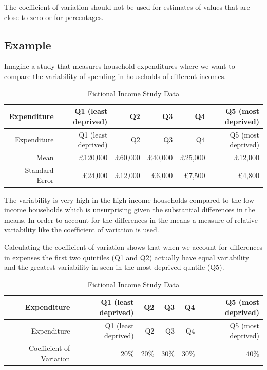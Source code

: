 \documentclass[
]{book}
\begin{document}
The coefficient of variation should not be used for estimates of values that are close to zero or for percentages.

\hypertarget{example}{%
\subsection{Example}\label{example}}

Imagine a study that measures household expenditures where we want to compare the variability of spending in households of different incomes.

\begin{longtable}[]{@{}rrrrrr@{}}
\caption{\label{tab:table0000} Fictional Income Study Data}\tabularnewline
\toprule
Expenditure & Q1 (least deprived) & Q2 & Q3 & Q4 & Q5 (most deprived) \\
\midrule
\endfirsthead
\toprule
Expenditure & Q1 (least deprived) & Q2 & Q3 & Q4 & Q5 (most deprived) \\
\midrule
\endhead
Mean & £120,000 & £60,000 & £40,000 & £25,000 & £12,000 \\
Standard Error & £24,000 & £12,000 & £6,000 & £7,500 & £4,800 \\
\bottomrule
\end{longtable}

The variability is very high in the high income households compared to the low income households which is unsurprising given the substantial differences in the means. In order to account for the differences in the means a measure of relative variability like the coefficient of variation is used.

Calculating the coefficient of variation shows that when we account for differences in expenses the first two quintiles (Q1 and Q2) actually have equal variability and the greatest variability in seen in the most deprived quntile (Q5).

\begin{longtable}[]{@{}rrrrrr@{}}
\caption{\label{tab:table00000} Fictional Income Study Data}\tabularnewline
\toprule
Expenditure & Q1 (least deprived) & Q2 & Q3 & Q4 & Q5 (most deprived) \\
\midrule
\endfirsthead
\toprule
Expenditure & Q1 (least deprived) & Q2 & Q3 & Q4 & Q5 (most deprived) \\
\midrule
\endhead
Coefficient of Variation & 20\% & 20\% & 30\% & 30\% & 40\% \\
\bottomrule
\end{longtable}
\end{document}
